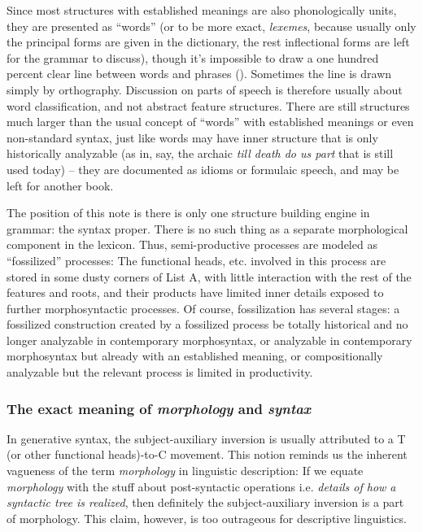 \documentclass[UTF8, a4paper, oneside, scheme=plain]{ctexrep}
\newcommand*{\term}[1]{\emph{#1}}
\newcommand{\corpus}[1]{\emph{#1}}
\begin{document}
Since most structures with established meanings 
are also phonologically units,
they are presented as ``words''
(or to be more exact, \term{lexemes}, 
because usually only the principal forms are given in the dictionary,
the rest inflectional forms are left for the grammar to discuss),
though it's impossible to draw a one hundred percent clear line 
between words and phrases ().
Sometimes the line is drawn simply by orthography.
Discussion on parts of speech is therefore usually about word classification,
and not abstract feature structures.
There are still structures much larger than the usual concept of ``words'' 
with established meanings or even non-standard syntax,
just like words may have inner structure that is only historically analyzable
(as in, say, the archaic \corpus{till death do us part} that is still used today) -- 
they are documented as idioms or formulaic speech,
and may be left for another book.

The position of this note is there is only one structure building engine in grammar:
the syntax proper.
There is no such thing as a separate morphological component in the lexicon.
Thus, semi-productive processes 
are modeled as ``fossilized'' processes:
The functional heads, etc. involved in this process 
are stored in some dusty corners of List A,
with little interaction with the rest of the features and roots,
and their products have limited inner details exposed to further morphosyntactic processes.
Of course, fossilization has several stages:
a fossilized construction created by a fossilized process 
be totally historical and no longer analyzable in contemporary morphosyntax,
or analyzable in contemporary morphosyntax but already with an established meaning,
or compositionally analyzable but the relevant process is limited in productivity.

\subsubsection{The exact meaning of \term{morphology} and \term{syntax}}\label{sec:morphology-meaning}

In generative syntax, the subject-auxiliary inversion is usually attributed to 
a T (or other functional heads)-to-C movement.
This notion reminds us the inherent vagueness of the term \term{morphology} in linguistic description:
If we equate \term{morphology} with the stuff about post-syntactic operations 
i.e. \emph{details of how a syntactic tree is realized},
then definitely the subject-auxiliary inversion is a part of morphology.
This claim, however, is too outrageous for descriptive linguistics.
\end{document}
